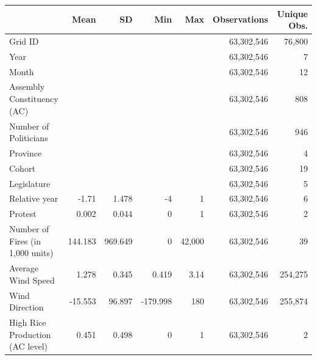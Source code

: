 \begin{tabular}{lrrrrrr}
\toprule
 & Mean & SD & Min & Max & Observations & Unique Obs.\\
\midrule
Grid ID &  &  &  &  & 63,302,546 & 76,800\\
Year &  &  &  &  & 63,302,546 & 7\\
Month &  &  &  &  & 63,302,546 & 12\\
Assembly Constituency (AC) &  &  &  &  & 63,302,546 & 808\\
Number of Politicians &  &  &  &  & 63,302,546 & 946\\
Province &  &  &  &  & 63,302,546 & 4\\
Cohort &  &  &  &  & 63,302,546 & 19\\
Legislature &  &  &  &  & 63,302,546 & 5\\
Relative year & -1.71 & 1.478 & -4 & 1 & 63,302,546 & 6\\
Protest & 0.002 & 0.044 & 0 & 1 & 63,302,546 & 2\\
Number of Fires (in 1,000 units) & 144.183 & 969.649 & 0 & 42,000 & 63,302,546 & 39\\
Average Wind Speed & 1.278 & 0.345 & 0.419 & 3.14 & 63,302,546 & 254,275\\
Wind Direction & -15.553 & 96.897 & -179.998 & 180 & 63,302,546 & 255,874\\
High Rice Production (AC level) & 0.451 & 0.498 & 0 & 1 & 63,302,546 & 2\\
\bottomrule
\end{tabular}
